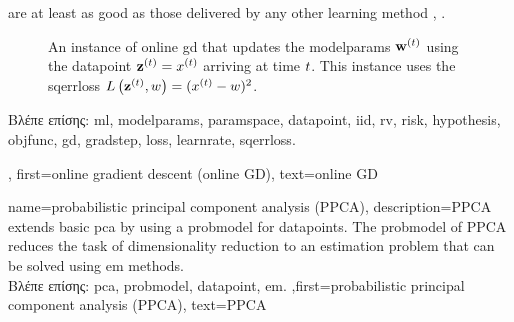 {{		are at least as good as those delivered by any other learning method \cite{HazanOCO}, \cite{GDOptimalRakhlin2012}. 
\begin{figure}[H]
	\begin{center}
\end{center} 
\caption{An instance of online \gls{gd} that updates the \gls{modelparams} ${\bf w}^{(t)}$ 
using the \gls{datapoint} ${\bf z}^{(t)} = x^{(t)}$ arriving at time $t$. 
This instance uses the \gls{sqerrloss} $L\left({\bf z}^{(t)},w \right) = (x^{(t)} - w)^{2}$.
}
\end{figure}
\foreignlanguage{greek}{Βλέπε επίσης:} \gls{ml}, \gls{modelparams}, \gls{paramspace}, \gls{datapoint}, \gls{iid}, \gls{rv}, \gls{risk}, \gls{hypothesis}, \gls{objfunc}, \gls{gd}, \gls{gradstep}, \gls{loss}, \gls{learnrate}, \gls{sqerrloss}.
},
first={online gradient descent (online GD)},
text={online GD} 
}

{name={probabilistic principal component analysis (PPCA)}, 
	description={PPCA
		extends basic \gls{pca} by using a \gls{probmodel} for \gls{datapoint}s. The \gls{probmodel} of PPCA 
		reduces the task of dimensionality reduction to an estimation problem that can be solved using \gls{em} 
		methods.\\
		\foreignlanguage{greek}{Βλέπε επίσης:} \gls{pca}, \gls{probmodel}, \gls{datapoint}, \gls{em}.
		},first={probabilistic principal component analysis (PPCA)},
		text={PPCA}
}

